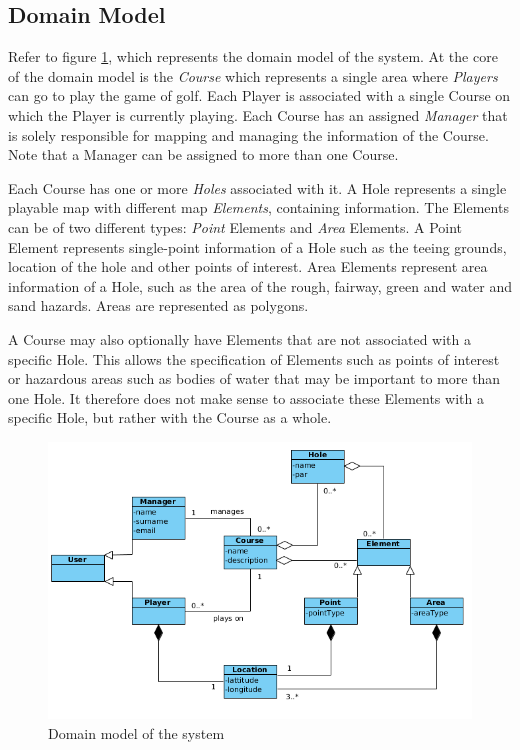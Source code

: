 \documentclass{article}
\begin{document}
    \subsection{Domain Model}

    Refer to figure \ref{fig:domainmodel}, which represents the domain model of
    the system. At the core of the domain model is the \textit{Course} which
    represents a single area where \textit{Players} can go to play the game of
    golf. Each Player is associated with a single Course on which the Player is
    currently playing. Each Course has an assigned \textit{Manager} that is
    solely responsible for mapping and managing the information of the Course.
    Note that a Manager can be assigned to more than one Course.

    Each Course has one or more \textit{Holes} associated with it. A Hole
    represents a single playable map with different map \textit{Elements},
    containing information. The Elements can be of two different types:
    \textit{Point} Elements and \textit{Area} Elements. A Point Element
    represents single-point information of a Hole such as the teeing grounds,
    location of the hole and other points of interest. Area Elements represent
    area information of a Hole, such as the area of the rough, fairway, green
    and water and sand hazards. Areas are represented as polygons.

    A Course may also optionally have Elements that are not associated with a
    specific Hole. This allows the specification of Elements such as points of
    interest or hazardous areas such as bodies of water that may be important
    to more than one Hole. It therefore does not make sense to associate these
    Elements with a specific Hole, but rather with the Course as a whole.
    
    \begin{figure}[h]
    	\centering
    	\includegraphics[scale=0.5]{DomainModel}
        \caption{Domain model of the system}
        \label{fig:domainmodel}
    \end{figure}
\end{document}
